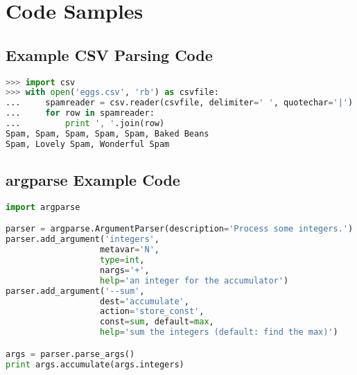 \chapter{Code Samples}

\section{Example CSV Parsing Code}
\begin{lstlisting}[language=python,breaklines=true,
caption={Example CSV Parsing Code from http://docs.python.org/2/library/csv.html},
label=lst:csv_example_code, frame=single]
>>> import csv
>>> with open('eggs.csv', 'rb') as csvfile:
...     spamreader = csv.reader(csvfile, delimiter=' ', quotechar='|')
...     for row in spamreader:
...         print ', '.join(row)
Spam, Spam, Spam, Spam, Spam, Baked Beans
Spam, Lovely Spam, Wonderful Spam
\end{lstlisting}

\section{argparse Example Code}
\begin{lstlisting}[language=python,
caption={Example argparse Code from http://docs.python.org/2/library/argparse.html},
label=lst:argparse_example_code, frame=single, breaklines=true]
import argparse

parser = argparse.ArgumentParser(description='Process some integers.')
parser.add_argument('integers',
                   metavar='N',
                   type=int, 
                   nargs='+',
                   help='an integer for the accumulator')
parser.add_argument('--sum',
                   dest='accumulate',
                   action='store_const',
                   const=sum, default=max,
                   help='sum the integers (default: find the max)')

args = parser.parse_args()
print args.accumulate(args.integers)
\end{lstlisting}

